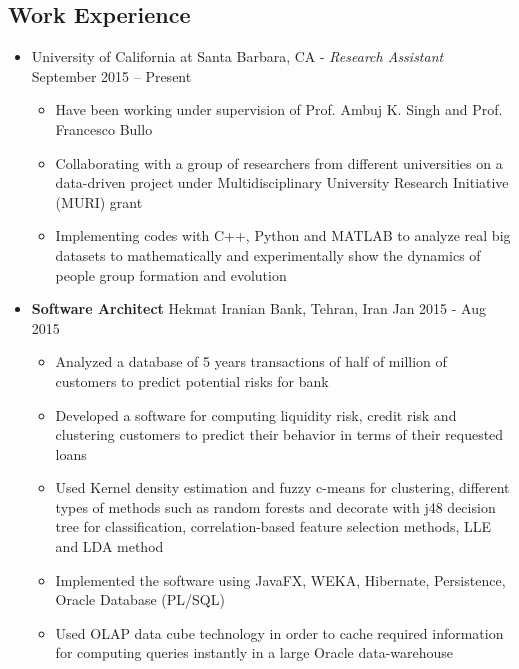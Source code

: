 \documentclass[letter]{res}
\begin{document}
\begin{resume}
		\section{Work Experience}
		\begin{itemize}[leftmargin=-.1in]			
			\item University of California at Santa Barbara, CA \newline
			- {\sl Research Assistant} \hfill September 2015 – Present\\
			\vspace{-4mm}
			\iflong
			\begin{itemize}
				\item Have been working under supervision of Prof. Ambuj K. Singh and Prof. Francesco Bullo
				\item Collaborating with a group of researchers from different universities on a data-driven project under Multidisciplinary University Research Initiative (MURI) grant
				\item Implementing codes with C++, Python and MATLAB to analyze real big datasets to mathematically and experimentally show the dynamics of people group formation and evolution
			\end{itemize}
			\fi 
			
			\item \textbf{Software Architect} \newline
			Hekmat Iranian Bank, Tehran, Iran \hfill Jan 2015 - Aug 2015\\
			\vspace{-4mm}
			\iflong
			\begin{itemize}
				\item Analyzed a database of 5 years transactions of half of million of customers to predict potential risks for bank
				\item Developed a software for computing liquidity risk, credit risk and clustering customers to predict their behavior in terms of their requested loans 
				\item Used Kernel density estimation and fuzzy c-means for clustering, different types of methods such as random forests and decorate with j48 decision tree for classification, correlation-based feature selection methods, LLE and LDA method
				\item Implemented the software using JavaFX, WEKA, Hibernate, Persistence, Oracle Database (PL/SQL)
				\item Used OLAP data cube technology in order to cache required information for computing queries instantly in a large Oracle data-warehouse
			\end{itemize}
			\fi
			

\end{itemize}
\end{resume}
\end{document}
